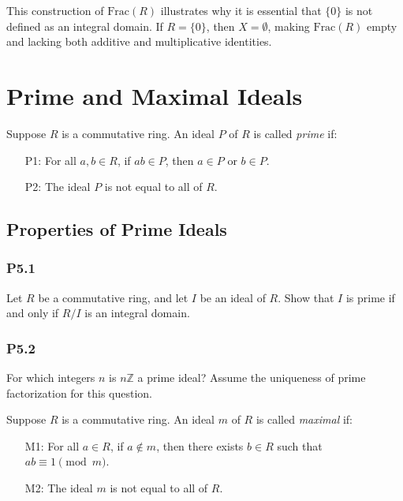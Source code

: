 \documentclass[lang=cn,11pt]{template}
\begin{document}
\begin{remark}
This construction of \( \text{Frac}(R) \) illustrates why it is essential that \( \{0\} \) is not defined as an integral domain. If \( R = \{0\} \), then \( X = \emptyset \), making \( \text{Frac}(R) \) empty and lacking both additive and multiplicative identities.
\end{remark}







\chapter{Prime and Maximal Ideals}

\begin{definition}
Suppose \( R \) is a commutative ring. An ideal \( P \) of \( R \) is called \textit{prime} if:
\begin{itemize}
    \item[P1:] For all \( a, b \in R \), if \( ab \in P \), then \( a \in P \) or \( b \in P \).
    \item[P2:] The ideal \( P \) is not equal to all of \( R \).
\end{itemize}
\end{definition}

\section{Properties of Prime Ideals}

\subsection*{P5.1} Let \( R \) be a commutative ring, and let \( I \) be an ideal of \( R \). Show that \( I \) is prime if and only if \( R/I \) is an integral domain.

\subsection*{P5.2} For which integers \( n \) is \( n\mathbb{Z} \) a prime ideal? Assume the uniqueness of prime factorization for this question.

\begin{definition}
Suppose \( R \) is a commutative ring. An ideal \( m \) of \( R \) is called \textit{maximal} if:
\begin{itemize}
    \item[M1:] For all \( a \in R \), if \( a \notin m \), then there exists \( b \in R \) such that \( ab \equiv 1 \pmod{m} \).
    \item[M2:] The ideal \( m \) is not equal to all of \( R \).
\end{itemize}
\end{definition}
\end{document}
